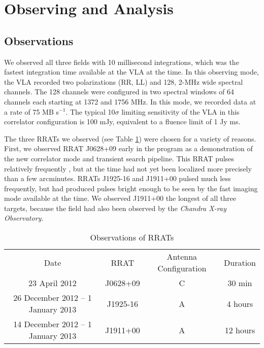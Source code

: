 \section{Observing and Analysis}

\subsection{Observations}

We observed all three fields with 10 millisecond integrations, which was the fastest integration time available at the VLA at the time. In this observing mode, the VLA recorded two polarizations (RR, LL) and 128, 2-MHz wide spectral channels. The 128 channels were configured in two spectral windows of 64 channels each starting at 1372 and 1756 MHz. In this mode, we recorded data at a rate of 75 MB s$^{-1}$. The typical 10$\sigma$ limiting sensitivity of the VLA in this correlator configuration is 100 mJy, equivalent to a fluence limit of 1 Jy ms.

The three RRATs we observed (see Table \ref{tab:obs}) were chosen for a variety of reasons. First, we observed RRAT J0628+09 early in the program as a demonstration of the new correlator mode and transient search pipeline. This RRAT pulses relatively frequently \citep[141 bursts per hour seen by Arecibo;][]{2009ApJ...703.2259D}, but at the time had not yet been localized more precisely than a few arcminutes. RRATs J1925-16 and J1911+00 pulsed much less frequently, but had produced pulses bright enough to be seen by the fast imaging mode available at the time. We observed J1911+00 the longest of all three targets, because the field had also been observed by the \emph{Chandra X-ray Observatory}.

\begin{table} 
    \begin{tabular}{ c c c c }
        Date & RRAT & Antenna Configuration & Duration \\ 
         23 April 2012 & J0628+09 & C & 30 min \\ 
         26 December 2012 -- 1 January 2013 & J1925-16 & A & 4 hours \\ 
         14 December 2012 -- 1 January 2013 & J1911+00 & A & 12 hours \\
    \end{tabular} 
    \caption{Observations of RRATs \label{tab:obs}} 
\end{table}
 
  
  
  